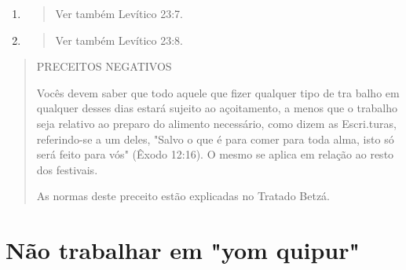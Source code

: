 \begin{enumerate}
\def\labelenumi{\arabic{enumi}.}
\setcounter{enumi}{439}
\item
 \begin{quote}
 Ver também Levítico 23:7.
 \end{quote}
\item
 \begin{quote}
 Ver também Levítico 23:8.
 \end{quote}
\end{enumerate}

\begin{quote}
PRECEITOS NEGATIVOS

Vocês devem saber que todo aquele que fizer qualquer tipo de tra balho
em qualquer desses dias estará sujeito ao açoitamento, a menos que o
trabalho seja relativo ao preparo do alimento necessário, como dizem as
Escri­.turas, referindo-se a um deles, "Salvo o que é
para comer para toda alma, isto só será feito para vós" (Êxodo 12:16). O
mesmo se aplica em relação ao resto dos festivais.

As normas deste preceito estão explicadas no Tratado Betzá.
\end{quote}

\section{Não trabalhar em "yom quipur"}

